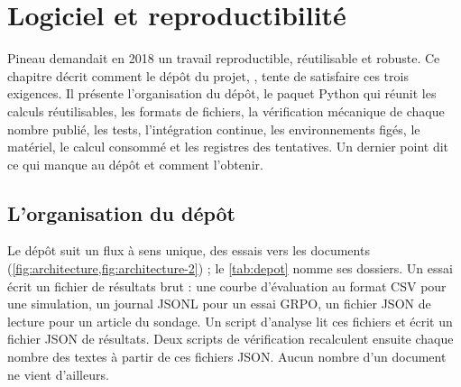 \chapter{Logiciel et reproductibilité}
\label{chap:08-logiciel}

Pineau demandait en 2018 un travail reproductible, réutilisable et robuste. Ce chapitre décrit
comment le dépôt du projet, \repo, tente de satisfaire ces trois exigences. Il présente
l'organisation du dépôt, le paquet Python qui réunit les calculs réutilisables, les formats de
fichiers, la vérification mécanique de chaque nombre publié, les tests, l'intégration continue,
les environnements figés, le matériel, le calcul consommé et les registres des tentatives. Un dernier point dit ce qui manque au
dépôt et comment l'obtenir.

\section{L'organisation du dépôt}
\label{sec:depot}

Le dépôt suit un flux à sens unique, des essais vers les documents
(\cref{fig:architecture,fig:architecture-2}) ; le \cref{tab:depot} nomme ses dossiers. Un essai écrit un fichier de résultats brut : une courbe d'évaluation au
format CSV pour une simulation, un journal JSONL pour un essai GRPO, un fichier JSON de lecture pour
un article du sondage. Un script d'analyse lit ces fichiers et écrit un fichier JSON de résultats.
Deux scripts de vérification recalculent ensuite chaque nombre des textes à partir de ces fichiers
JSON. Aucun nombre d'un document ne vient d'ailleurs.



